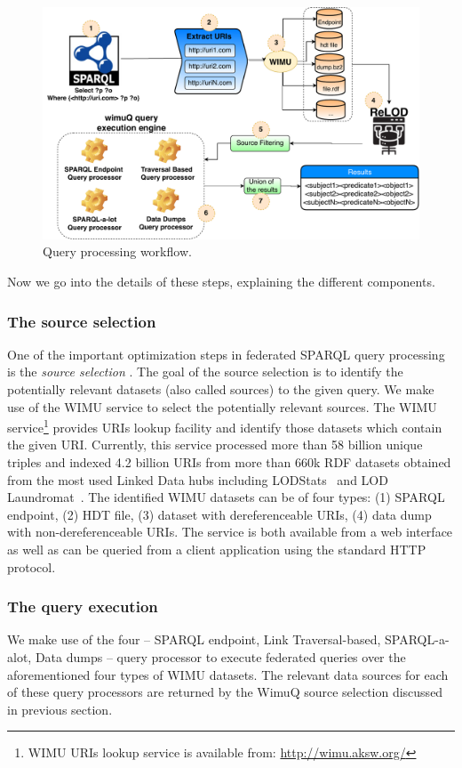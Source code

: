 \documentclass[sw]{iosart2x}
\begin{document}
\begin{figure}[htb] 
	\centering
	\includegraphics[width=0.8\linewidth]{img/wimuQ2.pdf}
	\caption{Query processing workflow.}
	\label{fig:approachWimuQ}
\end{figure}

Now we go into the details of these steps, explaining the different components. 

\subsubsection{The source selection}
One of the important optimization steps in federated SPARQL query processing is the \emph{source selection} \cite{costfed2017,hibiscus2014}. The goal of the source selection is to identify the potentially relevant datasets (also called sources) to the given query. We make use of the WIMU service \cite{valdestilhas2018my} to select the potentially relevant sources. The WIMU service\footnote{WIMU URIs lookup service is available from: \url{http://wimu.aksw.org/}} provides URIs lookup facility and identify those datasets which contain the given URI. Currently, this service processed more than 58 billion unique triples and indexed 4.2 billion URIs from more than 660k RDF datasets obtained from the most used Linked Data hubs including LODStats~\cite{auer2012lodstats} and LOD Laundromat~\cite{beek2014lod}. The identified WIMU datasets can be of four types: (1) SPARQL endpoint, (2) HDT file, (3) dataset with dereferenceable URIs, (4) data dump with non-dereferenceable URIs. 
The service is both available from a web interface as well as can be queried from a client application using the standard HTTP protocol.

\subsubsection{The query execution}
We make use of the four -- SPARQL endpoint, Link Traversal-based, SPARQL-a-alot, Data dumps -- query processor to execute federated queries over the aforementioned four types of WIMU datasets. The relevant data sources for each of these query processors are returned by the WimuQ source selection discussed in previous section. 
\end{document}

